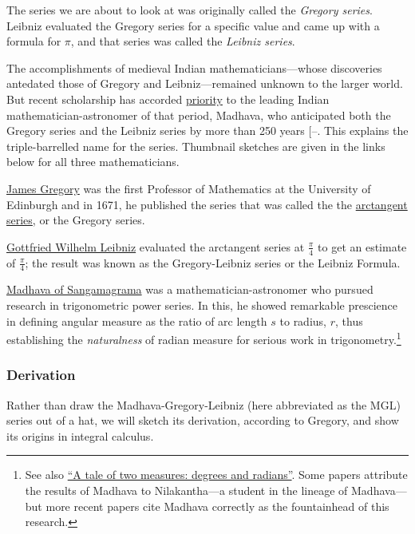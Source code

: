 \documentclass[
  a4paper,
]{article}
\begin{document}
The series we are about to look at was originally called the
\emph{Gregory series}. Leibniz evaluated the Gregory series for a
specific value and came up with a formula for \(\pi\), and that series
was called the \emph{Leibniz series}.

The accomplishments of medieval Indian mathematicians---whose
discoveries antedated those of Gregory and Leibniz---remained unknown to
the larger world. But recent scholarship has accorded
\href{https://en.wikipedia.org/wiki/Scientific_priority}{priority} to
the leading Indian mathematician-astronomer of that period, Madhava, who
anticipated both the Gregory series and the Leibniz series by more than
250 years
{[}--\citeproc{ref-madhava-wiki}{20}{]}. This
explains the triple-barrelled name for the series. Thumbnail sketches
are given in the links below for all three mathematicians.

\href{https://en.wikipedia.org/wiki/James_Gregory_(mathematician)}{James
Gregory} was the first Professor of Mathematics at the University of
Edinburgh and in 1671, he published the series that was called the the
\href{https://en.wikipedia.org/wiki/Arctangent_series}{arctangent
series}, or the Gregory series.

\href{https://www.google.com/search?q=Leibniz}{Gottfried Wilhelm
Leibniz} evaluated the arctangent series at \(\frac{\pi}{4}\) to get an
estimate of \(\frac{\pi}{4}\); the result was known as the
Gregory-Leibniz series or the Leibniz Formula.

\href{https://en.wikipedia.org/wiki/Madhava_of_Sangamagrama}{Madhava of
Sangamagrama} was a mathematician-astronomer who pursued research in
trigonometric power series. In this, he showed remarkable prescience in
defining angular measure as the ratio of arc length \(s\) to radius,
\(r\), thus establishing the \emph{naturalness} of radian measure for
serious work in trigonometry.\footnote{See also
  \href{https://swanlotus.netlify.app/blogs/a-tale-of-two-measures-degrees-and-radians}{``A
  tale of two measures: degrees and radians''}. Some papers attribute
  the results of Madhava to Nilakantha---a student in the lineage of
  Madhava---but more recent papers cite Madhava correctly as the
  fountainhead of this research.}

\subsubsection{Derivation}\label{derivation}

Rather than draw the Madhava-Gregory-Leibniz (here abbreviated as the
MGL) series out of a hat, we will sketch its derivation, according to
Gregory, and show its origins in integral calculus.
\end{document}
